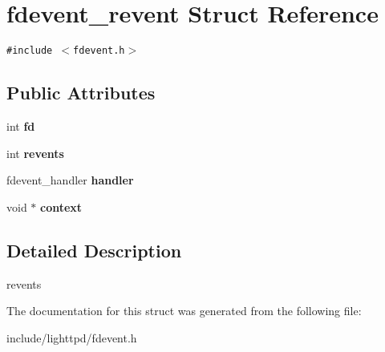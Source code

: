 \hypertarget{structfdevent__revent}{
\section{fdevent\_\-revent Struct Reference}
\label{structfdevent__revent}
}
{\tt \#include $<$fdevent.h$>$}

\subsection*{Public Attributes}
\begin{CompactItemize}
\item 
\hypertarget{structfdevent__revent_0511174750376607915efbc2999530ef}{
int \textbf{fd}}
\label{structfdevent__revent_0511174750376607915efbc2999530ef}

\item 
\hypertarget{structfdevent__revent_9970765b3c56e1fa12876903587e6217}{
int \textbf{revents}}
\label{structfdevent__revent_9970765b3c56e1fa12876903587e6217}

\item 
\hypertarget{structfdevent__revent_060ebbf352ec35006fdb3b791fc713a8}{
fdevent\_\-handler \textbf{handler}}
\label{structfdevent__revent_060ebbf352ec35006fdb3b791fc713a8}

\item 
\hypertarget{structfdevent__revent_deeeadf37a4432a3d3e61cd25d7b4271}{
void $\ast$ \textbf{context}}
\label{structfdevent__revent_deeeadf37a4432a3d3e61cd25d7b4271}

\end{CompactItemize}


\subsection{Detailed Description}
revents 

The documentation for this struct was generated from the following file:\begin{CompactItemize}
\item 
include/lighttpd/fdevent.h\end{CompactItemize}
